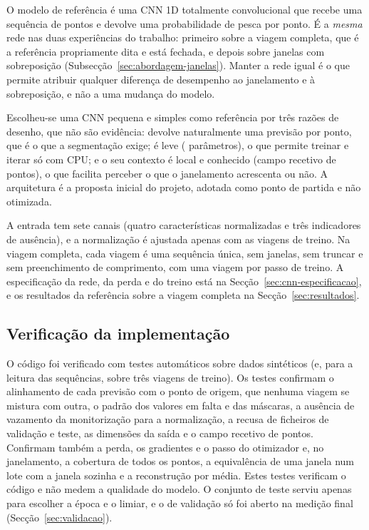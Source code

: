 \documentclass{article}
\newcommand{\revtext}[2]{{\color{#1}#2}}
\begin{document}
O modelo de referência é uma CNN 1D totalmente convolucional que recebe uma sequência de pontos e devolve uma probabilidade de pesca por ponto. É a \emph{mesma} rede nas duas experiências do trabalho: primeiro sobre a viagem completa, que é a referência propriamente dita e está fechada, e depois sobre janelas com sobreposição (Subsecção~\ref{sec:abordagem-janelas}). Manter a rede igual é o que permite atribuir qualquer diferença de desempenho ao janelamento e à sobreposição, e não a uma mudança do modelo.

Escolheu-se uma CNN pequena e simples como referência por três razões de desenho, que não são evidência: devolve naturalmente uma previsão por ponto, que é o que a segmentação exige; é leve (\resModParametros{} parâmetros), o que permite treinar e iterar só com CPU; e o seu contexto é local e conhecido (campo recetivo de \resModCampo{} pontos), o que facilita perceber o que o janelamento acrescenta ou não. A arquitetura é a proposta inicial do projeto, adotada como ponto de partida e não otimizada.

A entrada tem sete canais (quatro características normalizadas e três indicadores de ausência), e a normalização é ajustada apenas com as viagens de treino. Na viagem completa, cada viagem é uma sequência única, sem janelas, sem truncar e sem preenchimento de comprimento, com uma viagem por passo de treino. A especificação da rede, da perda e do treino está na Secção~\ref{sec:cnn-especificacao}, e os resultados da referência sobre a viagem completa na Secção~\ref{sec:resultados}.

\subsection{\texorpdfstring{Verificação da implementação}{Verificação da implementação}}
\label{sec:abordagem-verificacao}

\revtext{rev052}{O código foi verificado com testes automáticos sobre dados sintéticos (e, para a leitura das sequências, sobre três viagens de treino). Os testes confirmam o alinhamento de cada previsão com o ponto de origem, que nenhuma viagem se mistura com outra, o padrão dos valores em falta e das máscaras, a ausência de vazamento da monitorização para a normalização, a recusa de ficheiros de validação e teste, as dimensões da saída e o campo recetivo de \resModCampo{} pontos. Confirmam também a perda, os gradientes e o passo do otimizador e, no janelamento, a cobertura de todos os pontos, a equivalência de uma janela num lote com a janela sozinha e a reconstrução por média. Estes testes verificam o código e não medem a qualidade do modelo. O conjunto de teste serviu apenas para escolher a época e o limiar, \revtext{rev053}{e o de validação só foi aberto na medição final (Secção~\ref{sec:validacao}).}}
\end{document}
